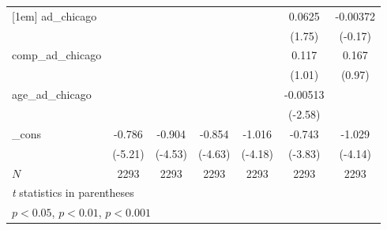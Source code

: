 {\begin{tabular}{l*{6}{c}}
[1em]
ad\_chicago  &                     &                     &                     &                     &      0.0625         &    -0.00372         \\
            &                     &                     &                     &                     &      (1.75)         &     (-0.17)         \\
[1em]
comp\_ad\_chicago&                     &                     &                     &                     &       0.117         &       0.167         \\
            &                     &                     &                     &                     &      (1.01)         &      (0.97)         \\
[1em]
age\_ad\_chicago&                     &                     &                     &                     &    -0.00513\sym{**} &                     \\
            &                     &                     &                     &                     &     (-2.58)         &                     \\
[1em]
\_cons      &      -0.786\sym{***}&      -0.904\sym{***}&      -0.854\sym{***}&      -1.016\sym{***}&      -0.743\sym{***}&      -1.029\sym{***}\\
            &     (-5.21)         &     (-4.53)         &     (-4.63)         &     (-4.18)         &     (-3.83)         &     (-4.14)         \\
\hline
\(N\)       &        2293         &        2293         &        2293         &        2293         &        2293         &        2293         \\
\hline\hline
\multicolumn{7}{l}{\footnotesize \textit{t} statistics in parentheses}\\
\multicolumn{7}{l}{\footnotesize \sym{*} \(p<0.05\), \sym{**} \(p<0.01\), \sym{***} \(p<0.001\)}\\
\end{tabular}
}
